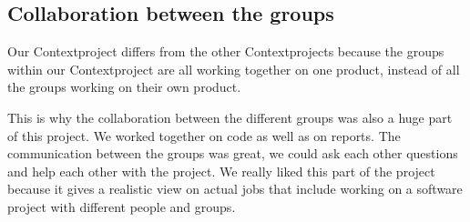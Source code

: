\subsection{Collaboration between the groups}
Our Contextproject differs from the other Contextprojects because the groups within our Contextproject are all working together on one product, instead of all the groups working on their own product. \par
This is why the collaboration between the different groups was also a huge part of this project. We worked together on code as well as on reports. The communication between the groups was great, we could ask each other questions and help each other with the project. We really liked this part of the project because it gives a realistic view on actual jobs that include working on a software project with different people and groups.